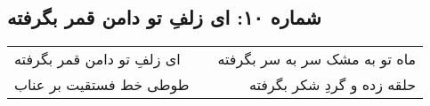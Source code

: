 \begin{center}
\section*{شماره ۱۰: ای زلفِ تو دامن قمر بگرفته}
\label{sec:010}
\begin{longtable}{l p{0.5cm} r}
ای زلفِ تو دامن قمر بگرفته
&&
ماه تو به مشک سر به سر بگرفته
\\
طوطی خط فستقیت بر عناب
&&
حلقه زده و گردِ شکر بگرفته
\\
\end{longtable}
\end{center}
